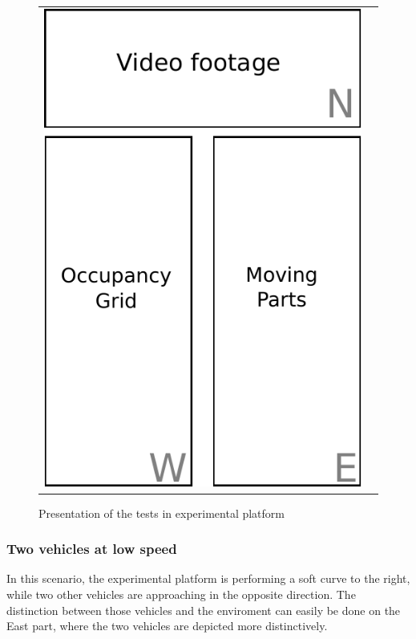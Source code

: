 \begin{figure}[H]
   \centering
     \begin{tabular}{lr}
       \includegraphics[scale=0.60]{img/fig:result:framework}
     \end{tabular}
   \caption{Presentation of the tests in experimental platform}
   \label{fig:result:framework}
\end{figure}

\subsubsection{Two vehicles at low speed}

In this scenario, the experimental platform is performing a soft curve to the right, while two other vehicles are approaching in the opposite direction. The distinction between those vehicles and the enviroment can easily be done on the East part, where the two vehicles are depicted more distinctively.

